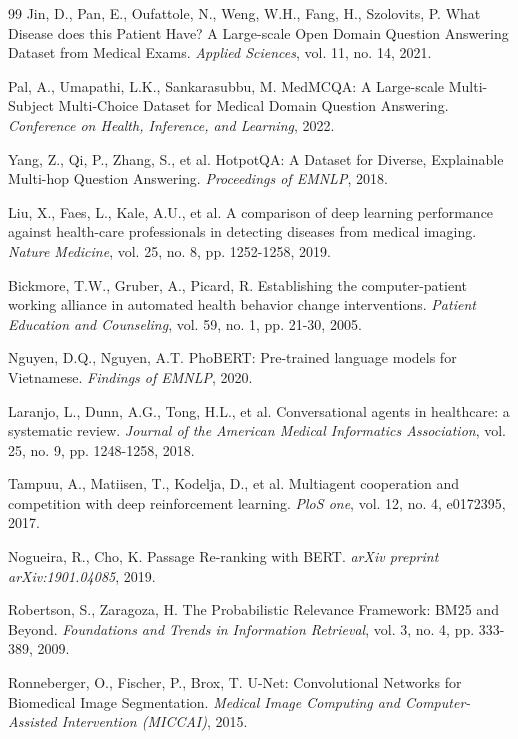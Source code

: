 \begin{thebibliography}{99}
         Jin, D., Pan, E., Oufattole, N., Weng, W.H., Fang, H., Szolovits, P. What Disease does this Patient Have? A Large-scale Open Domain Question Answering Dataset from Medical Exams. \textit{Applied Sciences}, vol. 11, no. 14, 2021.

         Pal, A., Umapathi, L.K., Sankarasubbu, M. MedMCQA: A Large-scale Multi-Subject Multi-Choice Dataset for Medical Domain Question Answering. \textit{Conference on Health, Inference, and Learning}, 2022.

         Yang, Z., Qi, P., Zhang, S., et al. HotpotQA: A Dataset for Diverse, Explainable Multi-hop Question Answering. \textit{Proceedings of EMNLP}, 2018.
        
         Liu, X., Faes, L., Kale, A.U., et al. A comparison of deep learning performance against health-care professionals in detecting diseases from medical imaging. \textit{Nature Medicine}, vol. 25, no. 8, pp. 1252-1258, 2019.
                
         Bickmore, T.W., Gruber, A., Picard, R. Establishing the computer-patient working alliance in automated health behavior change interventions. \textit{Patient Education and Counseling}, vol. 59, no. 1, pp. 21-30, 2005.
                
         Nguyen, D.Q., Nguyen, A.T. PhoBERT: Pre-trained language models for Vietnamese. \textit{Findings of EMNLP}, 2020.
        
         Laranjo, L., Dunn, A.G., Tong, H.L., et al. Conversational agents in healthcare: a systematic review. \textit{Journal of the American Medical Informatics Association}, vol. 25, no. 9, pp. 1248-1258, 2018.
                
         Tampuu, A., Matiisen, T., Kodelja, D., et al. Multiagent cooperation and competition with deep reinforcement learning. \textit{PloS one}, vol. 12, no. 4, e0172395, 2017.
        
         Nogueira, R., Cho, K. Passage Re-ranking with BERT. \textit{arXiv preprint arXiv:1901.04085}, 2019.

         Robertson, S., Zaragoza, H. The Probabilistic Relevance Framework: BM25 and Beyond. \textit{Foundations and Trends in Information Retrieval}, vol. 3, no. 4, pp. 333-389, 2009.
        
         Ronneberger, O., Fischer, P., Brox, T. U-Net: Convolutional Networks for Biomedical Image Segmentation. \textit{Medical Image Computing and Computer-Assisted Intervention (MICCAI)}, 2015.
        

\end{thebibliography}
